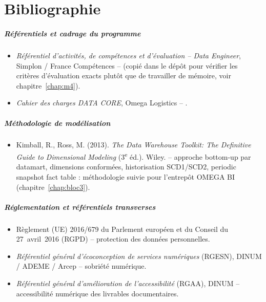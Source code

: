 \chapter*{Bibliographie}

\paragraph{Référentiels et cadrage du programme}
\begin{itemize}
  \item \textit{Référentiel d'activités, de compétences et d'évaluation
    -- Data Engineer}, Simplon / France Compétences --
    (copié dans le dépôt pour vérifier les critères d'évaluation exacts
    plutôt que de travailler de mémoire, voir chapitre~\ref{chap:m4}).
  \item \textit{Cahier des charges DATA CORE}, Omega Logistics --
    .
\end{itemize}

\paragraph{Méthodologie de modélisation}
\begin{itemize}
  \item Kimball, R., Ross, M. (2013). \textit{The Data Warehouse
    Toolkit: The Definitive Guide to Dimensional Modeling} (3\textsuperscript{e}
    éd.). Wiley. -- approche bottom-up par datamart, dimensions
    conformées, historisation SCD1/SCD2, periodic snapshot fact table :
    méthodologie suivie pour l'entrepôt OMEGA BI
    (chapitre~\ref{chap:bloc3}).
\end{itemize}

\paragraph{Réglementation et référentiels transverses}
\begin{itemize}
  \item Règlement (UE) 2016/679 du Parlement européen et du Conseil du
    27~avril~2016 (RGPD) -- protection des données personnelles.
  \item \textit{Référentiel général d'écoconception de services
    numériques} (RGESN), DINUM / ADEME / Arcep -- sobriété numérique.
  \item \textit{Référentiel général d'amélioration de l'accessibilité}
    (RGAA), DINUM -- accessibilité numérique des livrables documentaires.
\end{itemize}

